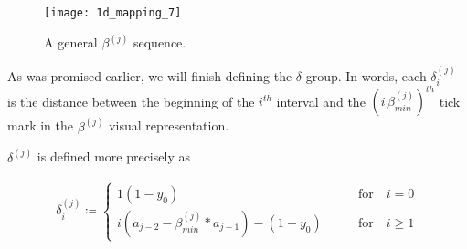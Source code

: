 \begin{figure}[H]
  \begin{center}
    \texttt{[image: 1d\_mapping\_7]}
  \end{center}
  \vspace{-.2in} %
  \caption{\label{fig:beta-sequence-j} A general $\beta^{(j)}$ sequence.}
\end{figure}

As was promised earlier, we will finish defining the $\delta$ group. In words, each $\delta^{(j)}_i$ is the distance between the beginning of the $i^{th}$ interval and the $(i \, \beta^{(j)}_{min})^{th}$ tick mark in the $\beta^{(j)}$ visual representation.

\begin{definition}
  $\delta^{(j)}$ is defined more precisely as

  \begin{align}\label{delta_beta}
    \delta^{(j)}_i \coloneqq \begin{cases}
      1(1-y_0) \qquad &\text{for} \quad i = 0\\
      i (a_{j-2} - \beta^{(j)}_{min} * a_{j-1}) - (1-y_0) \qquad &\text{for} \quad i \ge 1
    \end{cases}
  \end{align}
\end{definition}


